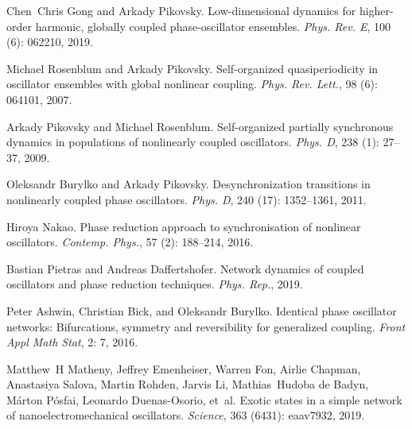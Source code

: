 Chen~Chris Gong and Arkady Pikovsky.
\newblock Low-dimensional dynamics for higher-order harmonic, globally coupled
phase-oscillator ensembles.
\newblock \emph{Phys. Rev. E}, 100 (6): 062210, 2019.

Michael Rosenblum and Arkady Pikovsky.
\newblock Self-organized quasiperiodicity in oscillator ensembles with global
nonlinear coupling.
\newblock \emph{Phys. Rev. Lett.}, 98 (6): 064101, 2007.

Arkady Pikovsky and Michael Rosenblum.
\newblock Self-organized partially synchronous dynamics in populations of
nonlinearly coupled oscillators.
\newblock \emph{Phys. D}, 238 (1): 27--37, 2009.

Oleksandr Burylko and Arkady Pikovsky.
\newblock Desynchronization transitions in nonlinearly coupled phase
oscillators.
\newblock \emph{Phys. D}, 240 (17): 1352--1361, 2011.

Hiroya Nakao.
\newblock Phase reduction approach to synchronisation of nonlinear oscillators.
\newblock \emph{Contemp. Phys.}, 57 (2): 188--214, 2016.

Bastian Pietras and Andreas Daffertshofer.
\newblock Network dynamics of coupled oscillators and phase reduction
techniques.
\newblock \emph{Phys. Rep.}, 2019.

Peter Ashwin, Christian Bick, and Oleksandr Burylko.
\newblock Identical phase oscillator networks: Bifurcations, symmetry and
reversibility for generalized coupling.
\newblock \emph{Front Appl Math Stat}, 2: 7, 2016.

Matthew~H Matheny, Jeffrey Emenheiser, Warren Fon, Airlie Chapman, Anastasiya
Salova, Martin Rohden, Jarvis Li, Mathias~Hudoba {de Badyn}, M{\'a}rton
P{\'o}sfai, Leonardo {Duenas-Osorio}, et~al.
\newblock Exotic states in a simple network of nanoelectromechanical
oscillators.
\newblock \emph{Science}, 363 (6431): eaav7932, 2019.

